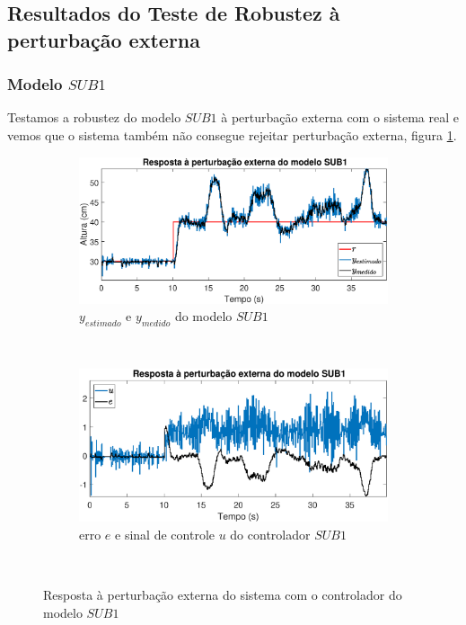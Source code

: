\subsection{Resultados do Teste de Robustez à perturbação externa}\label{rpe}

\subsubsection{Modelo $SUB1$}
Testamos a robustez do modelo $SUB1$ à perturbação externa com o sistema real e vemos que o sistema também não consegue rejeitar perturbação externa, figura \ref{fig:pextrsub1y}.

\begin{figure}[htb]
	\centering
	\begin{subfigure}[t]{0.48\textwidth}
		\includegraphics[width=1\linewidth]{pextrsub1y}
		\caption[$y_{estimado}$ e $y_{medido}$ do modelo $SUB1$]{$y_{estimado}$ e $y_{medido}$ do modelo $SUB1$}
		\label{fig:pextrsub1y}
	\end{subfigure}
	~ %
	\begin{subfigure}[t]{0.48\textwidth}
		\includegraphics[width=1\linewidth]{pextrsub1e}
		\caption[erro $e$ e sinal de controle $u$ do controlador $SUB1$]{erro $e$ e sinal de controle $u$ do controlador $SUB1$}
		\label{fig:pextrsub1e}
	\end{subfigure}
	~ %
	
	\caption{Resposta à perturbação externa do sistema com o controlador do modelo $SUB1$}\label{fig:pextrsub1}
\end{figure}

